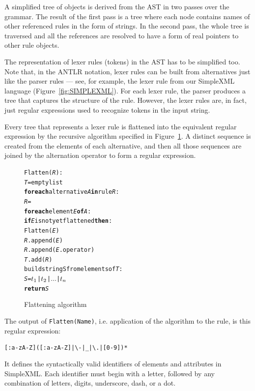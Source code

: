 A simplified tree of objects is derived from the AST in two passes over the grammar.
The result of the first pass is a tree where each node contains names of other referenced rules in the form of strings.
In the second pass, the whole tree is traversed and all the references are resolved to have a form of real pointers to other rule objects.

The representation of lexer rules (tokens) in the AST has to be simplified too.
Note that, in the ANTLR notation, lexer rules can be built from alternatives just like the parser rules --- see, for example, the lexer rule  from our SimpleXML language (Figure~\ref{fig:SIMPLEXML}).
For each lexer rule, the parser produces a tree that captures the structure of the rule.
However, the lexer rules are, in fact, just regular expressions used to recognize tokens in the input string.

Every tree that represents a lexer rule is flattened into the equivalent regular expression by the recursive algorithm specified in Figure~\ref{fig:ALGFLATTEN}.
A distinct sequence is created from the elements of each alternative, and then all those sequences are joined by the alternation operator \code{$|$} to form a regular expression.

\begin{figure}[ht]
\centering
\begin{framed}
\begin{alltt}
Flatten(\textit{R}):
  \textit{T} = empty list
  \textbf{for each} alternative \textit{A} \textbf{in} rule \textit{R}:
    \textit{R} = \antlrap\antlrap
    \textbf{for each} element \textit{E} \textbf{of} \textit{A}:
      \textbf{if} \textit{E} is not yet flattened \textbf{then}:
        Flatten(\textit{E})
      \textit{R}.append(\textit{E})
      \textit{R}.append(\textit{E}.operator)
    \textit{T}.add(\textit{R})
  build string S from elements of \textit{T}:
    \textit{S} = \(t\sb{1}\) | \(t\sb{2}\) | \(\ldots\) | \(t\sb{n}\)
  \textbf{return} \textit{S}
\end{alltt}
\end{framed}
\caption{Flattening algorithm}
\label{fig:ALGFLATTEN}
\end{figure}

The output of \texttt{Flatten(Name)}, i.e. application of the algorithm to the  rule, is this regular expression:

\begin{center}
  \texttt{[:a-zA-Z]([:a-zA-Z]|\textbackslash-|{\_}|\textbackslash.|[0-9])*}
\end{center}
It defines the syntactically valid identifiers of elements and attributes in SimpleXML.
Each identifier must begin with a letter, followed by any combination of letters, digits, underscore, dash, or a dot.


